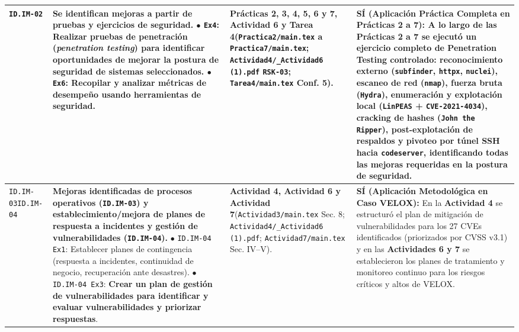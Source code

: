 \documentclass[letterpaper,11pt]{article}
\begin{document}
\begin{longtable}{|C{1.5cm}|L{5.3cm}|L{4.3cm}|L{5.8cm}|}
\texttt{ID.IM-02} &
\textbf{Se identifican mejoras a partir de pruebas y ejercicios de seguridad.}\newline
$\bullet$ \texttt{Ex4}: \textbf{Realizar pruebas de penetración (\textit{penetration testing}) para identificar oportunidades de mejorar la postura de seguridad de sistemas seleccionados}.\newline
$\bullet$ \texttt{Ex6}: Recopilar y analizar métricas de desempeño usando herramientas de seguridad. &
\textbf{Prácticas 2, 3, 4, 5, 6 y 7, Actividad 6 y Tarea 4}\newline (\texttt{Practica2/main.tex} a \texttt{Practica7/main.tex}; \texttt{Actividad4/\_Actividad6 (1).pdf} \texttt{RSK-03}; \texttt{Tarea4/main.tex} Conf. 5). &
\textbf{SÍ (Aplicación Práctica Completa en Prácticas 2 a 7):}\newline
A lo largo de las \textbf{Prácticas 2 a 7} se ejecutó un ejercicio completo de \textbf{Penetration Testing} controlado: reconocimiento externo (\texttt{subfinder}, \texttt{httpx}, \texttt{nuclei}), escaneo de red (\texttt{nmap}), fuerza bruta (\texttt{Hydra}), enumeración y explotación local (\texttt{LinPEAS} + \texttt{CVE-2021-4034}), cracking de hashes (\texttt{John the Ripper}), post-explotación de respaldos y pivoteo por túnel SSH hacia \texttt{codeserver}, identificando todas las mejoras requeridas en la postura de seguridad. \\
\hline

\texttt{ID.IM-03}\newline \texttt{ID.IM-04} &
\textbf{Mejoras identificadas de procesos operativos (\texttt{ID.IM-03}) y establecimiento/mejora de planes de respuesta a incidentes y gestión de vulnerabilidades (\texttt{ID.IM-04}).}\newline
$\bullet$ \texttt{ID.IM-04 Ex1}: Establecer planes de contingencia (respuesta a incidentes, continuidad de negocio, recuperación ante desastres).\newline
$\bullet$ \texttt{ID.IM-04 Ex3}: \textbf{Crear un plan de gestión de vulnerabilidades para identificar y evaluar vulnerabilidades y priorizar respuestas}. &
\textbf{Actividad 4, Actividad 6 y Actividad 7}\newline (\texttt{Actividad3/main.tex} Sec. 8; \texttt{Actividad4/\_Actividad6 (1).pdf}; \texttt{Actividad7/main.tex} Sec. IV--V). &
\textbf{SÍ (Aplicación Metodológica en Caso VELOX):}\newline
En la \textbf{Actividad 4} se estructuró el plan de mitigación de vulnerabilidades para los 27 CVEs identificados (priorizados por CVSS v3.1) y en las \textbf{Actividades 6 y 7} se establecieron los planes de tratamiento y monitoreo continuo para los riesgos críticos y altos de VELOX. \\
\hline
\end{longtable}
\endgroup
\end{document}
